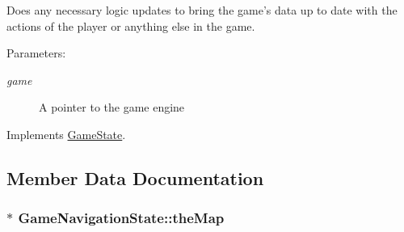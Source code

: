 Does any necessary logic updates to bring the game's data up to date with the actions of the player or anything else in the game.

\begin{Desc}
\item[Parameters:]
\begin{description}
\item[{\em game}]A pointer to the game engine \end{description}
\end{Desc}


Implements \hyperlink{class_game_state_100ca49bc95afce1d5c5b756708bbc2b}{GameState}.

\subsection{Member Data Documentation}
\hypertarget{class_game_navigation_state_83154f9523275696f30c13447e1d74f3}{
\subsubsection[{theMap}]{$\ast$ {\bf GameNavigationState::theMap}}}
\label{class_game_navigation_state_83154f9523275696f30c13447e1d74f3}


